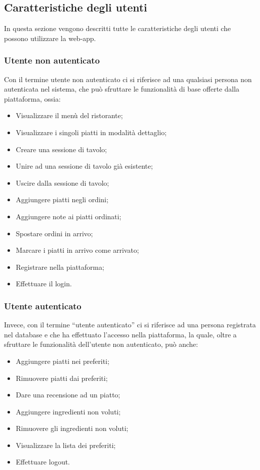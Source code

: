 \subsection{Caratteristiche degli utenti}
In questa sezione vengono descritti tutte le caratteristiche degli utenti che possono utilizzare la web-app.
\subsubsection{Utente non autenticato}
Con il termine utente non autenticato ci si riferisce ad una qualsiasi persona non autenticata nel sistema, che può sfruttare le funzionalità di base offerte dalla piattaforma, ossia:
\begin{itemize}
    \item Visualizzare il menù del ristorante;
    \item Visualizzare i singoli piatti in modalità dettaglio;
    \item Creare una sessione di tavolo;
    \item Unire ad una sessione di tavolo già esistente;
    \item Uscire dalla sessione di tavolo;
    \item Aggiungere piatti negli ordini;
    \item Aggiungere note ai piatti ordinati;
    \item Spostare ordini in arrivo;
    \item Marcare i piatti in arrivo come arrivato;
    \item Registrare nella piattaforma;
    \item Effettuare il login.
\end{itemize}
\subsubsection{Utente autenticato}
Invece, con il termine “utente autenticato” ci si riferisce ad una persona registrata nel database e che ha effettuato l'accesso nella piattaforma, la quale, oltre a sfruttare le funzionalità dell'utente non autenticato, può anche:
\begin{itemize}
    \item Aggiungere piatti nei preferiti;
    \item Rimuovere piatti dai preferiti;
    \item Dare una recensione ad un piatto;
    \item Aggiungere ingredienti non voluti;
    \item Rimuovere gli ingredienti non voluti;
    \item Visualizzare la lista dei preferiti;
    \item Effettuare logout.
\end{itemize}
